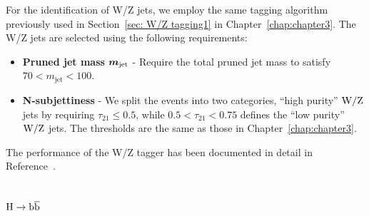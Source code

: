 For the identification of W/Z jets, we employ the same tagging algorithm 
previously used in Section~\ref{sec: W/Z tagging1} in Chapter~\ref{chap:chapter3}.  The W/Z jets are selected using the following requirements:
\begin{itemize}

\item {\bf Pruned jet mass}  $\mbox{\boldmath$m_{\text{jet}}$}$
  - Require the total pruned jet mass to satisfy $70 < m_\text{jet} <  100$\GeVcc.

\item {\bf N-subjettiness} 
  - We split the events into two categories, ``high purity'' ${\rm W}/{\rm Z}$ jets by
    requiring $\tau_{21} \leq 0.5$, while $ 0.5 < \tau_{21} < 0.75$ defines 
    the ``low purity'' ${\rm W}/{\rm Z}$ jets.  The thresholds are the same as those in 
    Chapter~\ref{chap:chapter3}. 
\end{itemize}
The performance of the W/Z tagger has been documented in detail in Reference~\cite{JME-13-006}.















\subsection{${\rm H\to\mathrm{b\overline{b}}}$ }
\label{sec:higgsTaggerbb}


